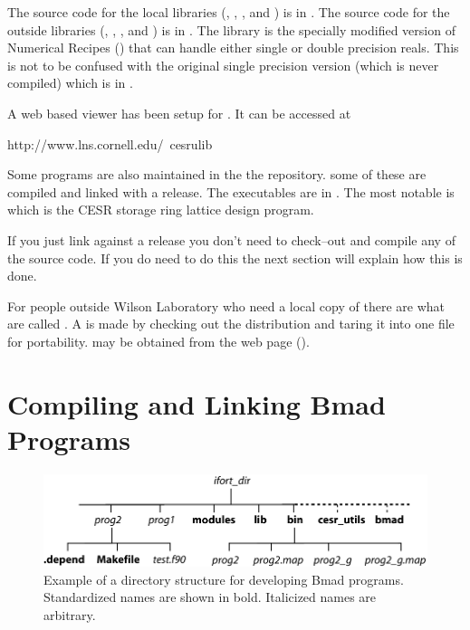 The source code for the local libraries (, ,
, and ) is in . The
source code for the outside libraries (, ,
, and ) is in . The
 library is the specially modified version of
Numerical Recipes () that can handle either single or
double precision reals. This is not to be confused with the original
single precision version (which is never compiled) 
which is in . 

A web based viewer has been setup for \bmad. It can be accessed at
\begin{example}
  http://www.lns.cornell.edu/~cesrulib
\end{example}

Some programs are also maintained in the the \svn repository. some of
these are compiled and linked with a release. The executables are in
. The most notable is  which is the CESR
storage ring lattice design program.

If you just link against a release you don't need to check--out and
compile any of the \bmad source code. If you do need to do this the
next section will explain how this is done.

For people outside Wilson Laboratory who need a local copy of \bmad
there are what are called . A  is
made by checking out the \bmad distribution and taring it into one
file for portability.  may be obtained from the
\bmad web page ().

\section{Compiling and Linking Bmad Programs}
\label{s:compile}

\begin{figure}[tb]
  \begin{centering}
  \includegraphics{devel-dir.pdf}
  \caption[Standard Directory Structure for Bmad Programs.]
{Example of a directory structure for developing Bmad programs. Standardized
names are shown in bold. Italicized names are arbitrary.}
  \label{f:devel.dir}
  \end{centering}
\end{figure}

